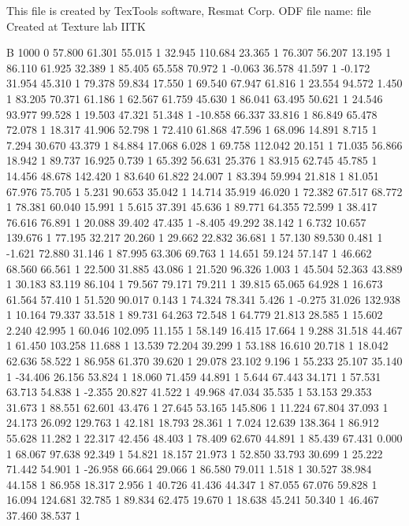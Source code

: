 This file is created by TexTools software, Resmat Corp.
ODF file name: file Created at Texture lab IITK

B 1000 0
	57.800 61.301 55.015 1
	32.945 110.684 23.365 1
	76.307 56.207 13.195 1
	86.110 61.925 32.389 1
	85.405 65.558 70.972 1
	-0.063 36.578 41.597 1
	-0.172 31.954 45.310 1
	79.378 59.834 17.550 1
	69.540 67.947 61.816 1
	23.554 94.572 1.450 1
	83.205 70.371 61.186 1
	62.567 61.759 45.630 1
	86.041 63.495 50.621 1
	24.546 93.977 99.528 1
	19.503 47.321 51.348 1
	-10.858 66.337 33.816 1
	86.849 65.478 72.078 1
	18.317 41.906 52.798 1
	72.410 61.868 47.596 1
	68.096 14.891 8.715 1
	7.294 30.670 43.379 1
	84.884 17.068 6.028 1
	69.758 112.042 20.151 1
	71.035 56.866 18.942 1
	89.737 16.925 0.739 1
	65.392 56.631 25.376 1
	83.915 62.745 45.785 1
	14.456 48.678 142.420 1
	83.640 61.822 24.007 1
	83.394 59.994 21.818 1
	81.051 67.976 75.705 1
	5.231 90.653 35.042 1
	14.714 35.919 46.020 1
	72.382 67.517 68.772 1
	78.381 60.040 15.991 1
	5.615 37.391 45.636 1
	89.771 64.355 72.599 1
	38.417 76.616 76.891 1
	20.088 39.402 47.435 1
	-8.405 49.292 38.142 1
	6.732 10.657 139.676 1
	77.195 32.217 20.260 1
	29.662 22.832 36.681 1
	57.130 89.530 0.481 1
	-1.621 72.880 31.146 1
	87.995 63.306 69.763 1
	14.651 59.124 57.147 1
	46.662 68.560 66.561 1
	22.500 31.885 43.086 1
	21.520 96.326 1.003 1
	45.504 52.363 43.889 1
	30.183 83.119 86.104 1
	79.567 79.171 79.211 1
	39.815 65.065 64.928 1
	16.673 61.564 57.410 1
	51.520 90.017 0.143 1
	74.324 78.341 5.426 1
	-0.275 31.026 132.938 1
	10.164 79.337 33.518 1
	89.731 64.263 72.548 1
	64.779 21.813 28.585 1
	15.602 2.240 42.995 1
	60.046 102.095 11.155 1
	58.149 16.415 17.664 1
	9.288 31.518 44.467 1
	61.450 103.258 11.688 1
	13.539 72.204 39.299 1
	53.188 16.610 20.718 1
	18.042 62.636 58.522 1
	86.958 61.370 39.620 1
	29.078 23.102 9.196 1
	55.233 25.107 35.140 1
	-34.406 26.156 53.824 1
	18.060 71.459 44.891 1
	5.644 67.443 34.171 1
	57.531 63.713 54.838 1
	-2.355 20.827 41.522 1
	49.968 47.034 35.535 1
	53.153 29.353 31.673 1
	88.551 62.601 43.476 1
	27.645 53.165 145.806 1
	11.224 67.804 37.093 1
	24.173 26.092 129.763 1
	42.181 18.793 28.361 1
	7.024 12.639 138.364 1
	86.912 55.628 11.282 1
	22.317 42.456 48.403 1
	78.409 62.670 44.891 1
	85.439 67.431 0.000 1
	68.067 97.638 92.349 1
	54.821 18.157 21.973 1
	52.850 33.793 30.699 1
	25.222 71.442 54.901 1
	-26.958 66.664 29.066 1
	86.580 79.011 1.518 1
	30.527 38.984 44.158 1
	86.958 18.317 2.956 1
	40.726 41.436 44.347 1
	87.055 67.076 59.828 1
	16.094 124.681 32.785 1
	89.834 62.475 19.670 1
	18.638 45.241 50.340 1
	46.467 37.460 38.537 1
